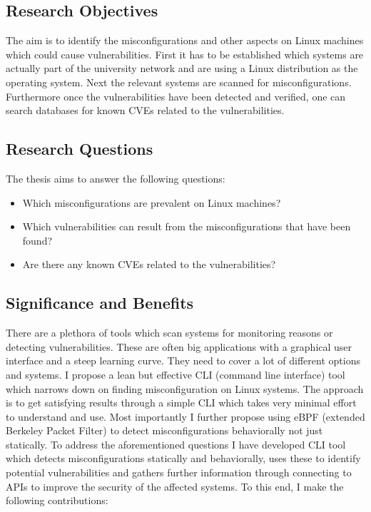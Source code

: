 \subsection{Research Objectives}

The aim is to identify the misconfigurations and other aspects on Linux machines which could cause vulnerabilities. \newline\newline First it has to be established which systems are actually part of the university network and are using a Linux distribution as the operating system. Next the relevant systems are scanned for misconfigurations. Furthermore once the vulnerabilities have been detected and verified, one can search databases for known CVEs related to the vulnerabilities. 

\newpage

\subsection{Research Questions}

The thesis aims to answer the following questions:

\begin{itemize}
	\item Which misconfigurations are prevalent on Linux machines?
	\item Which vulnerabilities can result from the misconfigurations that have been found?
	\item Are there any known CVEs related to the vulnerabilities?
\end{itemize}

\subsection{Significance and Benefits}

There are a plethora of tools which scan systems for monitoring reasons or detecting vulnerabilities. These are often big applications with a graphical user interface and a steep learning curve. They need to cover a lot of different options and systems. I propose a lean but effective CLI (command line interface) tool which narrows down on finding misconfiguration on Linux systems. The approach is to get satisfying results through a simple CLI which takes very minimal effort to understand and use. Most importantly I further propose using eBPF (extended Berkeley Packet Filter) to detect misconfigurations behaviorally not just statically. \newline\newline To address the aforementioned questions I have developed CLI tool which detects misconfigurations statically and behaviorally, uses these to identify potential vulnerabilities and gathers further information through connecting to APIs to improve the security of the affected systems. \newline To this end, I make the following contributions:

